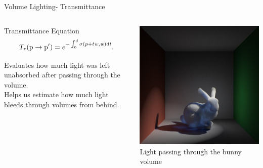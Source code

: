 \documentclass[10pt,compress,professionalfont]{beamer}
\begin{document}
\begin{frame}{Volume Lighting- Transmittance}


    \begin{columns}
        \begin{column}{0.5\textwidth}

            \begin{block}{Transmittance Equation}
                \[
                    T_{r}(\textup{p} \to \textup{p}') = e^{-\int_{0}^{d}\sigma (p+t\mathit{w},\mathit{w})d\mathit{t}}.
                \]
            \end{block}
            \vspace{5mm}

            Evaluates how much light was left unabsorbed after passing through the volume.\\
            \vspace{5mm}
            Helps us estimate how much light bleeds through volumes from behind.


        \end{column}
        \begin{column}{0.5\textwidth}
            \vspace{10mm}
            \includegraphics[width=\textwidth]{../img/bunny_spot/spot_right_new}\\
            {\centering\scriptsize Light passing through the bunny volume\\}
        \end{column}
    \end{columns}

\end{frame}
\end{document}
